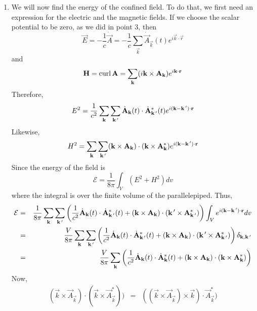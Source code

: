 \begin{enumerate}
\item We will now find the energy of the confined field. To do that, we first 
need an expression for the electric and the magnetic fields. If we choose the
scalar potential to be zero, as we did in point 3, then
\begin{equation}\label{c6e126}
\vec{E} = -\frac{1}{c}\dot{\vec{A}} = 
-\frac{1}{c}\sum_{\vec{k}}\dot{\vec{A}}_\vec{k}(t) e^{i\vec{k}\cdot\vec{r}}
\end{equation}
and
\begin{equation}\label{c6e127}
\mathbf{H} = \operatorname{curl}\mathbf{A} = \sum_\mathbf{k}(i\mathbf{k}\times\mathbf{A}_\mathbf{k})e^{i\mathbf{k}\cdot\mathbf{r}}
\end{equation}
Therefore,
\begin{equation}\label{c6e128}
E^2 = \frac{1}{c^2}\sum_{\mathbf{k}}\sum_{\mathbf{k}^{\,\prime}}
\dot{\mathbf{A}}_\mathbf{k}(t)\cdot\dot{\mathbf{A}}_{\mathbf{k}^{\,\prime}}^\ast(t)
e^{i(\mathbf{k}-\mathbf{k}^{\,\prime})\cdot\mathbf{r}}
\end{equation}
Likewise,
\begin{equation}\label{c6e129}
H^2 = \sum_{\mathbf{k}}\sum_{\mathbf{k}^{\,\prime}}(\mathbf{k}\times\mathbf{A}_\mathbf{k})\cdot
(\mathbf{k}\times\mathbf{A}_\mathbf{k}^\ast)e^{i(\mathbf{k}-\mathbf{k}^{\,\prime})\cdot\mathbf{r}}
\end{equation}
Since the energy of the field is
\[
\mathcal{E} = \frac{1}{8\pi}\int_V (E^2 + H^2)dv
\]
where the integral is over the finite volume of the parallelepiped. Thus,
\begin{eqnarray*}
\mathcal{E} &=& \frac{1}{8\pi}\sum_{\mathbf{k}}\sum_{\mathbf{k}^{\,\prime}}
\left(\frac{1}{c^2}\dot{\mathbf{A}}_\mathbf{k}(t)\cdot\dot{\mathbf{A}}_{\mathbf{k}^{\,\prime}}^\ast(t) +
(\mathbf{k}\times\mathbf{A}_\mathbf{k})\cdot(\mathbf{k}^{\,\prime}\times\mathbf{A}_{\mathbf{k}^{\,\prime}}^\ast)\right)
\int_V e^{i(\mathbf{k}-\mathbf{k}^{\,\prime})\cdot\mathbf{r}} dv \\
&=& \frac{V}{8\pi}\sum_{\mathbf{k}}\sum_{\mathbf{k}^{\,\prime}}
\left(\frac{1}{c^2}\dot{\mathbf{A}}_\mathbf{k}(t)\cdot\dot{\mathbf{A}}_{\mathbf{k}^{\,\prime}}^\ast(t) +
(\mathbf{k}\times\mathbf{A}_\mathbf{k})\cdot(\mathbf{k}^{\,\prime}\times\mathbf{A}_{\mathbf{k}^{\,\prime}}^\ast)\right)
\delta_{\mathbf{k}, \mathbf{k}^{\,\prime}} \\
&=& \frac{V}{8\pi}\sum_{\mathbf{k}}
\left(\frac{1}{c^2}\dot{\mathbf{A}}_\mathbf{k}(t)\cdot\dot{\mathbf{A}}_{\mathbf{k}}^\ast(t) +
(\mathbf{k}\times\mathbf{A}_\mathbf{k})\cdot(\mathbf{k}\times\mathbf{A}_\mathbf{k}^\ast)\right)
\end{eqnarray*}
Now,
\begin{eqnarray*}
(\vec{k}\times\vec{A}_\vec{k})\cdot(\vec{k}\times\vec{A}_\vec{k}^\ast)) 
&=& ((\vec{k}\times\vec{A}_\vec{k})\times\vec{k})\cdot\vec{A}_\vec{k}^\ast) \\

\end{eqnarray*}
\end{enumerate}
